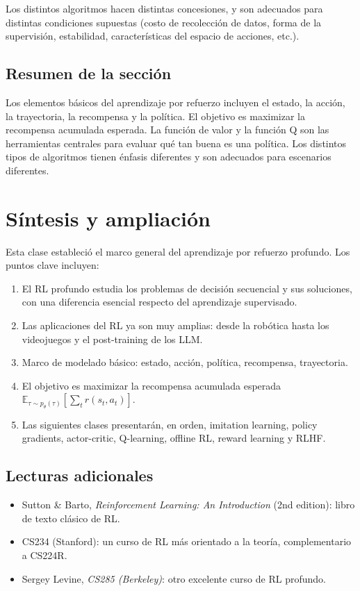 \documentclass[a4paper]{article}
\begin{document}
Los distintos algoritmos hacen distintas concesiones, y son adecuados para distintas condiciones supuestas (costo de recolección de datos, forma de la supervisión, estabilidad, características del espacio de acciones, etc.).

\subsection{Resumen de la sección}

Los elementos básicos del aprendizaje por refuerzo incluyen el estado, la acción, la trayectoria, la recompensa y la política. El objetivo es maximizar la recompensa acumulada esperada. La función de valor y la función Q son las herramientas centrales para evaluar qué tan buena es una política. Los distintos tipos de algoritmos tienen énfasis diferentes y son adecuados para escenarios diferentes.
\section{Síntesis y ampliación}

Esta clase estableció el marco general del aprendizaje por refuerzo profundo. Los puntos clave incluyen:

\begin{enumerate}
    \item El RL profundo estudia los problemas de decisión secuencial y sus soluciones, con una diferencia esencial respecto del aprendizaje supervisado.
    \item Las aplicaciones del RL ya son muy amplias: desde la robótica hasta los videojuegos y el post-training de los LLM.
    \item Marco de modelado básico: estado, acción, política, recompensa, trayectoria.
    \item El objetivo es maximizar la recompensa acumulada esperada $\mathbb{E}_{\tau \sim p_\theta(\tau)} \left[\sum_t r(s_t, a_t)\right]$.
    \item Las siguientes clases presentarán, en orden, imitation learning, policy gradients, actor-critic, Q-learning, offline RL, reward learning y RLHF.
\end{enumerate}

\subsection{Lecturas adicionales}
\begin{itemize}
    \item Sutton \& Barto, \textit{Reinforcement Learning: An Introduction} (2nd edition): libro de texto clásico de RL.
    \item CS234 (Stanford): un curso de RL más orientado a la teoría, complementario a CS224R.
    \item Sergey Levine, \textit{CS285 (Berkeley)}: otro excelente curso de RL profundo.
\end{itemize}

\end{document}

